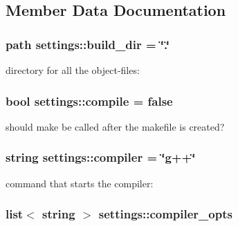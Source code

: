 \subsection{Member Data Documentation}
\hypertarget{structsettings_a900e5b234e36b0395feb215cd807bdac}{
\subsubsection[{build\-\_\-dir}]{\setlength{\rightskip}{0pt plus 5cm}path settings\-::build\-\_\-dir = \char`\"{}.\char`\"{}\hspace{0.3cm}{\ttfamily [static]}}}\label{structsettings_a900e5b234e36b0395feb215cd807bdac}
directory for all the object-\/files\-: \hypertarget{structsettings_a575bd5aad5894fe2b1a9c110506c4a0a}{
\subsubsection[{compile}]{\setlength{\rightskip}{0pt plus 5cm}bool settings\-::compile = false\hspace{0.3cm}{\ttfamily [static]}}}\label{structsettings_a575bd5aad5894fe2b1a9c110506c4a0a}
should make be called after the makefile is created? \hypertarget{structsettings_a208883e6fc65f3abafbfec8ca0d4989d}{
\subsubsection[{compiler}]{\setlength{\rightskip}{0pt plus 5cm}string settings\-::compiler = \char`\"{}g++\char`\"{}\hspace{0.3cm}{\ttfamily [static]}}}\label{structsettings_a208883e6fc65f3abafbfec8ca0d4989d}
command that starts the compiler\-: \hypertarget{structsettings_a5b9460853aa54ea3e48db46744122d54}{
\subsubsection[{compiler\-\_\-opts}]{\setlength{\rightskip}{0pt plus 5cm}list$<$ string $>$ settings\-::compiler\-\_\-opts\hspace{0.3cm}{\ttfamily [static]}}}\label{structsettings_a5b9460853aa54ea3e48db46744122d54}
